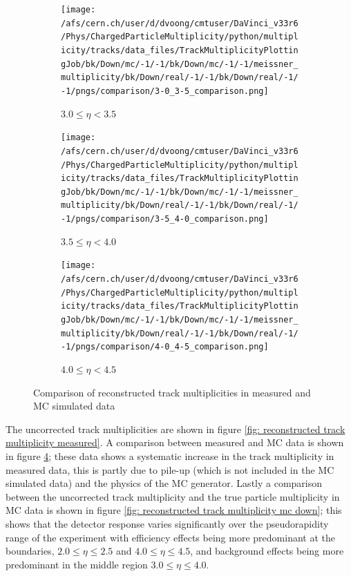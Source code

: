 \begin{figure}[h]
\begin{subfigure}[h]{0.32\textwidth}
		\texttt{[image: /afs/cern.ch/user/d/dvoong/cmtuser/DaVinci\_v33r6/Phys/ChargedParticleMultiplicity/python/multiplicity/tracks/data\_files/TrackMultiplicityPlottingJob/bk/Down/mc/-1/-1/bk/Down/mc/-1/-1/meissner\_multiplicity/bk/Down/real/-1/-1/bk/Down/real/-1/-1/pngs/comparison/3-0\_3-5\_comparison.png]}
		\caption{$3.0 \le \eta < 3.5$}
		\label{fig: reconstructed track multiplicity measured data-mc comparison 3.0 - 3.5}
	\end{subfigure}
	\begin{subfigure}[h]{0.32\textwidth}
		\texttt{[image: /afs/cern.ch/user/d/dvoong/cmtuser/DaVinci\_v33r6/Phys/ChargedParticleMultiplicity/python/multiplicity/tracks/data\_files/TrackMultiplicityPlottingJob/bk/Down/mc/-1/-1/bk/Down/mc/-1/-1/meissner\_multiplicity/bk/Down/real/-1/-1/bk/Down/real/-1/-1/pngs/comparison/3-5\_4-0\_comparison.png]}
		\caption{$3.5 \le \eta < 4.0$}
		\label{fig: reconstructed track multiplicity measured data-mc comparison 3.5 - 4.0}
	\end{subfigure}
	\begin{subfigure}[h]{0.32\textwidth}
		\texttt{[image: /afs/cern.ch/user/d/dvoong/cmtuser/DaVinci\_v33r6/Phys/ChargedParticleMultiplicity/python/multiplicity/tracks/data\_files/TrackMultiplicityPlottingJob/bk/Down/mc/-1/-1/bk/Down/mc/-1/-1/meissner\_multiplicity/bk/Down/real/-1/-1/bk/Down/real/-1/-1/pngs/comparison/4-0\_4-5\_comparison.png]}
		\caption{$4.0 \le \eta < 4.5$}
		\label{fig: reconstructed track multiplicity measured data-mc comparison 4.0 - 4.5}
	\end{subfigure}
	\caption{Comparison of reconstructed track multiplicities in measured and MC simulated data}
	\label{fig: reconstructed track multiplicity measured data mc comparison}
\end{figure}

The uncorrected track multiplicities are shown in figure \ref{fig: reconstructed track multiplicity measured}. A comparison between measured and MC data is shown in figure \ref{fig: reconstructed track multiplicity measured data mc comparison}; these data shows a systematic increase in the track multiplicity in measured data, this is partly due to pile-up (which is not included in the MC simulated data) and the physics of the MC generator. Lastly a comparison between the uncorrected track multiplicity and the true particle multiplicity in MC data is shown in figure \ref{fig: reconstructed track multiplicity mc down}; this shows that the detector response varies significantly over the pseudorapidity range of the experiment with efficiency effects being more predominant at the boundaries, $2.0 \le \eta \le 2.5$ and $4.0 \le \eta \le 4.5$, and background effects being more predominant in the middle region $3.0 \le \eta \le 4.0$. 

